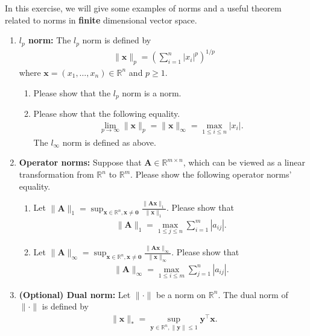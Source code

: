\documentclass[11pt,letter,notitlepage]{article}
\theoremstyle{definition}
\begin{document}
\begin{exercise}[Norms]
    In this exercise, we will give some examples of norms and a useful theorem related to norms in \textbf{finite} dimensional vector space.
    \begin{enumerate}
        \item \textbf{$l_p$ norm:} The $l_p$ norm is defined by
        \begin{align*}
			\|\mathbf{x}\|_p = \left(\sum_{i=1}^n |x_i|^p\right)^{1/p}
		\end{align*}
		where $\mathbf{x}=(x_1,\dots,x_n)\in \mathbb{R}^n$ and $p\ge 1$. 
		\begin{enumerate}
			\item Please show that the $l_p$ norm is a norm.
			\item Please show that the following equality.
			\begin{align*}
				\lim_{p\rightarrow \infty}\|\mathbf{x}\|_p = \|\mathbf{x}\|_{\infty} = \max_{1\le i\le n}|x_i|.
			\end{align*}
			The $l_{\infty}$ norm is defined as above.
		\end{enumerate}
		\item \textbf{Operator norms:} Suppose that $\mathbf{A}\in \mathbb{R}^{m\times n}$, which can be viewed as a linear transformation from $\mathbb{R}^n$ to $\mathbb{R}^m$. Please show the following operator norms' equality.
		\begin{enumerate}
			\item Let $\|\mathbf{A}\|_1 = \sup_{\mathbf{x}\in \mathbb{R}^n, \mathbf{x}\not=\mathbf{0}}\frac{\|\mathbf{Ax}\|_1}{\|\mathbf{x}\|_1}$. Please show that
			\begin{align*}
				\|\mathbf{A}\|_1 = \max_{1\le j\le n}\sum_{i=1}^m|a_{ij}|.
			\end{align*}
			\item Let $\|\mathbf{A}\|_{\infty} = \sup_{\mathbf{x}\in \mathbb{R}^n, \mathbf{x}\not=\mathbf{0}}\frac{\|\mathbf{Ax}\|_{\infty}}{\|\mathbf{x}\|_{\infty}}$. Please show that
			\begin{align*}
				\|\mathbf{A}\|_{\infty} = \max_{1\le i\le m}\sum_{j=1}^n|a_{ij}|.
			\end{align*}
		\end{enumerate}
		\item \textbf{(Optional) Dual norm:} Let $\|\cdot\|$ be a norm on $\mathbb{R}^n$. The dual norm of $\|\cdot\|$ is defined by
		\begin{align*}
			\|\mathbf{x}\|_* = \sup_{\mathbf{y}\in \mathbb{R}^n, \|\mathbf{y}\|\le 1}\mathbf{y}^{\top}\mathbf{x}.

\end{align*}
\end{enumerate}
\end{exercise}
\end{document}

